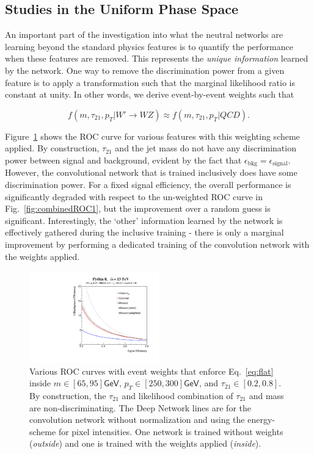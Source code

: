 \subsection{Studies in the Uniform Phase Space} %
\label{sub:flat_hypercube_studies}

An important part of the investigation into what the neutral networks are learning beyond the standard physics features is to quantify the performance when these features are removed.  This represents the {\it unique information} learned by the network.  One way to remove the discrimination power from a given feature is to apply a transformation such that the marginal likelihood ratio is constant at unity.  In other words, we derive event-by-event weights such that

\begin{equation}
\label{eq:flat}
  f(m, \tau_{21}, p_T| W'\rightarrow WZ) \approx f(m, \tau_{21}, p_T| QCD).
\end{equation}

Figure~\ref{fig:rocCube} shows the ROC curve for various features with this weighting scheme applied.  By construction, $\tau_{21}$ and the jet mass do not have any discrimination power between signal and background, evident by the fact that $\epsilon_\text{bkg}=\epsilon_\text{signal}$.    However, the convolutional network that is trained inclusively does have some discrimination power.  For a fixed signal efficiency, the overall performance is significantly degraded with respect to the un-weighted ROC curve in Fig.~\ref{fig:combinedROC1}, but the improvement over a random guess is significant.  Interestingly, the `other' information learned by the network is effectively gathered during the inclusive training - there is only a marginal improvement by performing a dedicated training of the convolution network with the weights applied.

\begin{figure}[htbp]
  \centering
    \includegraphics[width=0.5\textwidth]{figures/ROCs_window.pdf}
  \caption{Various ROC curves with event weights that enforce Eq.~\ref{eq:flat} inside $m\in[65, 95]\mathsf{GeV}$,  $p_T\in[250, 300]\mathsf{GeV}$, and  $\tau_{21}\in[0.2, 0.8]$.  By construction, the $\tau_{21}$ and likelihood combination of $\tau_{21}$ and mass are non-discriminating.  The Deep Network lines are for the convolution network without normalization and using the energy-scheme for pixel intensities.  One network is trained without weights ({\it outside}) and one is trained with the weights applied ({\it inside}).}
  \label{fig:rocCube}
\end{figure}


